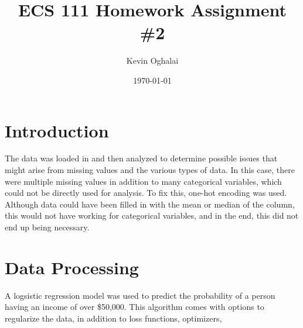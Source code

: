 \documentclass[12pt]{article}
\title{ECS 111 Homework Assignment \#2}
\author{Kevin Oghalai}
\date{\today}
\begin{document}
\maketitle
\section{Introduction}
The data was loaded in and then analyzed 
to determine possible issues that might arise from
missing values and the various types of data. 
In this case, there were multiple missing values 
in addition to many categorical variables, which could not be 
directly used for analysis. To fix this, one-hot encoding was used. 
Although data could have been filled in with the mean or median of the 
column, this would not have working for categorical variables, and in the end,
this did not end up being necessary.

\section{Data Processing}
A logsistic regression model was used to predict the probability of 
a person having an income of over \$50,000. This algorithm comes with
options to regularize the data, in addition to loss functions, optimizers, 
\end{document}
